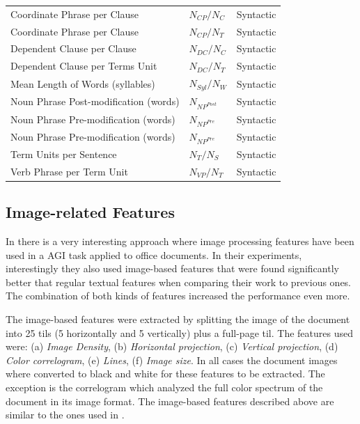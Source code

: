 \begin{table}[t]
\begin{tabular}{lll}
		Coordinate Phrase per Clause & $N_{CP}/N_{C}$ & Syntactic \\
		Coordinate Phrase per Clause & $N_{CP}/N_{T}$ & Syntactic \\
		Dependent Clause per Clause & $N_{DC}/N_{C}$ & Syntactic \\
		Dependent Clause per Terms Unit & $N_{DC}/N_{T}$ & Syntactic \\
		Mean Length of Words (syllables) & $N_{Syl}/N_{W}$ & Syntactic \\
		Noun Phrase Post-modification (words) & $N_{NP^{Post}}$ & Syntactic \\
		Noun Phrase Pre-modification (words) & $N_{NP^{Pre}}$ & Syntactic \\
		Noun Phrase Pre-modification (words) & $N_{NP^{Pre}}$ & Syntactic \\
		Term Units per Sentence & $N_{T}/N_{S}$ & Syntactic \\
		Verb Phrase per Term Unit &  $N_{VP}/N_{T}$ & Syntactic \\
		\hline
	\end{tabular}
\end{table}

\subsection{Image-related Features} 

In \parencite{chen2012genre} there is a very interesting approach where image processing features have been used in a AGI task applied to office documents. In their experiments, interestingly they also used image-based features that were found significantly better that regular textual features when comparing their work to previous ones. The combination of both kinds of features increased the performance even more.

The image-based features were extracted by splitting the image of the document into 25 tils (5 horizontally and 5 vertically) plus a full-page til. The features used were: (a) \textit{Image Density}, (b) \textit{Horizontal projection}, (c) \textit{Vertical projection}, (d) \textit{Color correlogram}, (e) \textit{Lines}, (f) \textit{Image size}. In all cases the document images where converted to black and white for these features to be extracted. The exception is the correlogram which analyzed the full color spectrum of the document in its image format. The image-based features described above are similar to the ones used in \parencite{clark2014you}.

